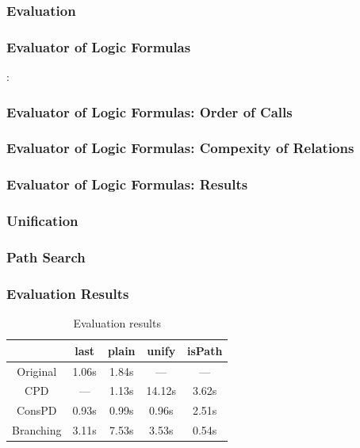 \documentclass[xcolor=table]{beamer}
\begin{document}
\begin{frame}[fragile]
  \transwipe[direction=90]
  \frametitle{Evaluation}
\end{frame}

\begin{frame}[fragile]
  \transwipe[direction=90]
  \frametitle{Evaluator of Logic Formulas}
\end{frame}

\begin{frame}[fragile]
  \transwipe[direction=90]  :
  \frametitle{Evaluator of Logic Formulas: Order of Calls}
\end{frame}

\begin{frame}[fragile]
  \transwipe[direction=90]
  \frametitle{Evaluator of Logic Formulas: Compexity of Relations}
\end{frame}

\begin{frame}[fragile]
  \transwipe[direction=90]
  \frametitle{Evaluator of Logic Formulas: Results}
\end{frame}

\begin{frame}[fragile]
  \transwipe[direction=90]
  \frametitle{Unification}
\end{frame}

\begin{frame}[fragile]
  \transwipe[direction=90]
  \frametitle{Path Search}
\end{frame}

\begin{frame}[fragile]
  \transwipe[direction=90]
  \frametitle{Evaluation Results}

  \begin{table}
    \centering
    \begin{tabular}{c||c|c||c||c}
                     & last  & plain & unify  & isPath \\ \hline\hline
    Original         & 1.06s & 1.84s & ---    & ---    \\ \hline
    CPD              & ---   & 1.13s & 14.12s & 3.62s  \\ \hline
    ConsPD           & 0.93s & 0.99s & 0.96s  & 2.51s  \\ \hline
    Branching        & 3.11s & 7.53s & 3.53s  & 0.54s  \\ \hline
    \end{tabular}

    \caption{Evaluation results}
    \label{tbl:eval}
  \end{table}

\end{frame}
\end{document}
